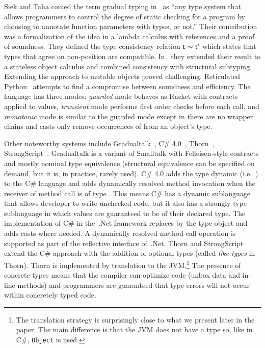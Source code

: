 \documentclass[a4paper,USenglish]{tex/lipics-v2016}
\newcommand{\code}[1]{{\tt #1}\xspace}
\begin{document}
Siek and Taha coined the term gradual typing in~\cite{SiekTaha06} as ``any
type system that allows programmers to control the degree of static checking
for a program by choosing to annotate function parameters with types, or
not.'' Their contribution was a formalization of the idea in a lambda
calculus with references and a proof of soundness. They defined the type
consistency relation $\t \sim \tp$ which states that types that agree on
non-\any position are compatible.  In~\cite{SiekTaha07} they extended their
result to a stateless object calculus and combined consistency with
structural subtyping. Extending the approach to mutable objects proved
challenging. Reticulated Python~\cite{siek14} attempts to find a compromise
between soundness and efficiency.  The language has three modes:
\emph{guarded} mode behaves as Racket with contracts applied to values,
\emph{transient} mode performs first order checks before each call, and
\emph{monotonic} mode is similar to the guarded mode except in there are no
wrapper chains and casts only remove occurrences of \any from an object's
type.

Other noteworthy systems include Gradualtalk~\cite{GS13}, C\#
4.0~\cite{Bierman10}, Thorn~\cite{oopsla09},
StrongScript~\cite{ecoop15}. Gradualtalk is a variant of Smalltalk with
Felleisen-style contracts and mostly nominal type equivalence (structural
equivalence can be specified on demand, but it is, in practice, rarely
used). C\# 4.0 adds the type {\sf dynamic} (i.e.~\any) to the C\# language
and adds dynamically resolved method invocation when the receiver of method
call is of type \any.  This means C\# has a dynamic sublanguage that allows
developer to write unchecked code, but it also has a strongly type
sublanguage in which values are guaranteed to be of their declared type.
The implementation of C\# in the~.Net framework replaces \any by the type
{\sf object} and adds casts where needed. A dynamically resolved method call
operation is supported as part of the reflective interface of~.Net.  Thorn
and StrongScript extend the C\# approach with the addition of optional types
(called {\em like types} in Thorn).  Thorn is implemented by translation to
the JVM.\footnote{The translation strategy is surprisingly close to what we
  present later in the paper. The main difference is that the JVM does not
  have a type \any so, like in C\#, \code{Object} is used.} The presence of
concrete types means that the compiler can optimize code (unbox data and
in-line methods) and programmers are guaranteed that type errors will not
occur within concretely typed code. 
\end{document}
